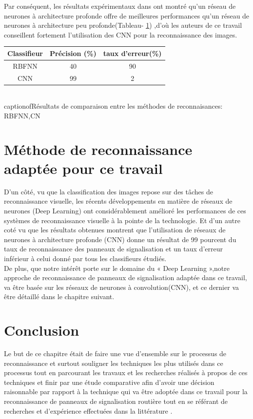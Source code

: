  Par conséquent, les résultats expérimentaux dans \cite{40} ont montré qu'un réseau de neurones à architecture profonde offre de meilleures performances qu'un réseau de neurones à architecture peu profonde(Tableau- \ref{table:reess}) ,d’où les auteurs de ce travail conseillent fortement l’utilisation des CNN pour la reconnaissance des images.\\
 \begin{table}[]
\centering
\begin{tabular}{|l|l|l|}
\hline
\multicolumn{1}{|c|}{Classifieur} & \multicolumn{1}{c|}{ Précision (\%)} & \multicolumn{1}{c|}{taux d'erreur(\%)} \\ \hline
\multicolumn{1}{|c|}{RBFNN}    & \multicolumn{1}{c|}{40 }  & \multicolumn{1}{c|}{90}\\ \hline
 \multicolumn{1}{|c|}{CNN}    & \multicolumn{1}{c|}{99}  & \multicolumn{1}{c|}{2}\\ \hline
\end{tabular}
\\captionof{Résultats de comparaison entre les méthodes de reconnaisances: RBFNN,CN \cite{40}}
\label{table:reess}
\end{table}
 
\section{Méthode de reconnaissance adaptée pour ce travail}
D’un côté, vu que la classification des images repose sur des tâches de reconnaissance visuelle, les récents développements en matière de réseaux de neurones (Deep Learning) ont considérablement amélioré les performances de ces systèmes de reconnaissance visuelle à la pointe de la technologie. Et d’un autre coté vu que les résultats obtenues montrent que l’utilisation de réseaux de neurones à architecture profonde (CNN) donne un résultat de 99 pourcent du taux de reconnaissance des panneaux de signalisation et un taux d’erreur inférieur à celui donné par tous les classifieurs étudiés.\\

De plus, que notre intérêt porte sur le domaine du « Deep Learning »,notre approche de reconnaissance de panneaux de signalisation adaptée dans ce travail, va être basée sur les réseaux de neurones à convolution(CNN), et ce dernier va être détaillé dans le chapitre suivant.


\section{Conclusion}
Le but de ce chapitre était de faire une vue d’ensemble sur le processus de reconnaissance et surtout souligner les techniques les plus utilisés dans ce processus tout en parcourant les travaux et les recherches réalisés à propos de ces techniques et finir par une étude comparative afin d’avoir une décision raisonnable par rapport à la technique qui va être adoptée dans ce travail pour la reconnaissance de panneaux de signalisation routière tout en se référant de  recherches et d’expérience effectuées dans la littérature  .



